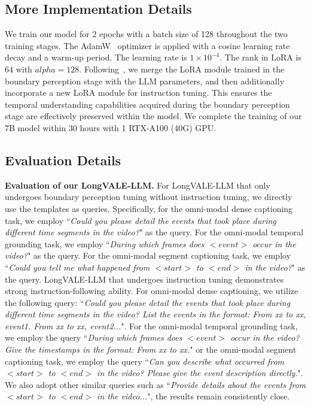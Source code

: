 \subsection{More Implementation Details}
We train our model for 2 epochs with a batch size of 128 throughout the two training stages. The AdamW~\cite{loshchilov2017decoupled} optimizer is applied with a cosine learning rate decay and a warm-up period. The learning rate is $1\times 10^{-4}$. The rank in LoRA is 64 with $alpha=128$. Following~\cite{huang2024vtimellm}, we merge the LoRA module trained in the boundary perception stage with the LLM parameters, and then additionally incorporate a new LoRA module for instruction tuning. This ensures the temporal understanding capabilities acquired during the boundary perception stage are effectively preserved within the model.
We complete the training of our 7B model within 30 hours with 1 RTX-A100 (40G) GPU.

\subsection{Evaluation Details}
\noindent\textbf{Evaluation of our LongVALE-LLM.}
For LongVALE-LLM that only undergoes boundary perception tuning without instruction tuning, we directly use the templates as queries. Specifically, for the omni-modal dense captioning task, we employ ``\textit{Could you please detail the events that took place during different time segments in the video?}" as the query. For the omni-modal temporal grounding task, we employ ``\textit{During which frames does $<event>$ occur in the video?}" as the query. For the omni-modal segment captioning task, we employ ``\textit{Could you tell me what happened from $<start>$ to $<end>$ in the video?}" as the query.
LongVALE-LLM that undergoes instruction tuning demonstrates strong instruction-following ability. For omni-modal dense captioning, we utilize the following query: ``\textit{Could you please detail the events that took place during different time segments in the video? List the events in the format: From xx to xx, event1. From xx to xx, event2...}". 
For the omni-modal temporal grounding task, we employ the query ``\textit{During which frames does $<event>$ occur in the video? Give the timestamps in the format: From xx to xx.}" 
or the omni-modal segment captioning task, we employ the query ``\textit{Can you describe what occurred from $<start>$ to 
$<end>$ in the video? Please give the event description directly.}".
We also adopt other similar queries such as ``\textit{Provide details about the events from $<start>$ to $<end>$ in the video...}", the results remain consistently close. 

